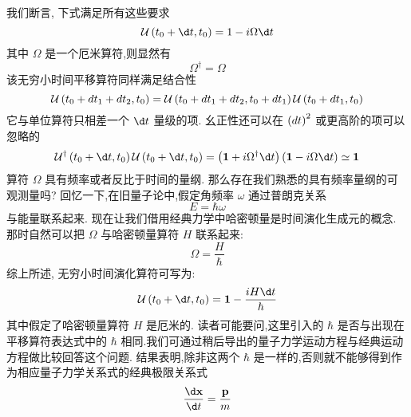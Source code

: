 \documentclass[lang=cn,newtx,10pt,scheme=chinese,thmcnt=section]{elegantbook}
\begin{document}
我们断言, 下式满足所有这些要求
\begin{equation}
	\mathcal{U}\left( {{t}_{0} + {\d t},{t}_{0}}\right) = 1 - {i\Omega \d t}
\end{equation}
其中 $\Omega$ 是一个厄米算符,则显然有
\begin{equation}
	{\Omega }^{ \dagger } = \Omega
\end{equation}
该无穷小时间平移算符同样满足结合性
\begin{equation}
	\mathcal{U}\left( {{t}_{0} + \\d{t}_{1} + \\d{t}_{2},{t}_{0}}\right) = \mathcal{U}\left( {{t}_{0} + \\d{t}_{1} + \\d{t}_{2},{t}_{0} + \\d{t}_{1}}\right) \mathcal{U}\left( {{t}_{0} + \\d{t}_{1},{t}_{0}}\right) 
\end{equation}
它与单位算符只相差一个 ${\d t}$ 量级的项. 幺正性还可以在 ${\left( \\d t\right) }^{2}$ 或更高阶的项可以忽略的
\begin{equation}
	{\mathcal{U}}^{ \dagger }\left( {{t}_{0} + {\d t},{t}_{0}}\right) \mathcal{U}\left( {{t}_{0} + {\d t},{t}_{0}}\right) = \left( {\textbf{1} + i{\Omega }^{ \dagger }{\d t}}\right) \left( {\textbf{1} - {i\Omega \d t}}\right) \simeq \textbf{1}
\end{equation}
算符 $\Omega$ 具有频率或者反比于时间的量纲. 那么存在我们熟悉的具有频率量纲的可观测量吗? 回忆一下,在旧量子论中,假定角频率 $\omega$ 通过普朗克关系
\begin{equation}
	E = \hbar \omega
\end{equation}
与能量联系起来. 现在让我们借用经典力学中哈密顿量是时间演化生成元的概念. 那时自然可以把 $\Omega$ 与哈密顿量算符 $H$ 联系起来:
\begin{equation}
	\Omega = \frac{H}{\hbar }
\end{equation}
综上所述, 无穷小时间演化算符可写为:
\begin{equation}
	\mathcal{U}\left( {{t}_{0} + {\d t},{t}_{0}}\right) = \textbf{1} - \frac{iH\d t}{\hbar }
\end{equation}
其中假定了哈密顿量算符 $H$ 是厄米的. 读者可能要问,这里引入的 $\hbar$ 是否与出现在平移算符表达式中的 $\hbar$ 相同.我们可通过稍后导出的量子力学运动方程与经典运动方程做比较回答这个问题. 结果表明,除非这两个 $\hbar$ 是一样的,否则就不能够得到作为相应量子力学关系式的经典极限关系式
\begin{equation}
	\frac{\d\mathbf{x}}{\d t} = \frac{\mathbf{p}}{m}
\end{equation}
\end{document}
